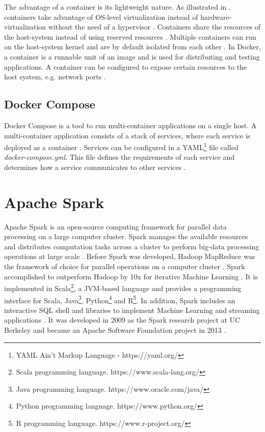 The advantage of a container is its lightweight nature. As illustrated in , containers take advantage of OS-level virtualization instead of hardware-virtualization without the need of a hypervisor \cite{Docker2020Docs, Nickoloff2019Docker}. Containers share the resources of the host-system instead of using reserved resources \cite{Bullington2020Docker}. Multiple containers can run on the host-system kernel and are by default isolated from each other \cite{Docker2020Docs}.
In Docker, a container is a runnable unit of an image and is used for distributing and testing applications. A container can be configured to expose certain resources to the host system, e.g. network ports \cite{Bullington2020Docker}.


\subsection{Docker Compose}
Docker Compose is a tool to run multi-container applications on a single host. A multi-container application consists of a stack of services, where each service is deployed as a container \cite{Bullington2020Docker, Docker2020Docs}.
Services can be configured in a YAML\footnote{YAML Ain't Markup Language - https://yaml.org/} file called \textit{docker-compose.yml}. This file defines the requirements of each service and determines how a service communicates to other services \cite{Kane2018DockerUp}.


\section{Apache Spark}
Apache Spark is an open-source computing framework for parallel data processing on a large computer cluster. Spark manages the available resources and distributes computation tasks across a cluster to perform big-data processing operations at large scale \cite{Chambers2018Spark}. Before Spark was developed, Hadoop MapReduce \cite{Dean2010MapReduce} was the framework of choice for parallel operations on a computer cluster \cite{Zaharia2010Spark}. Spark accomplished to outperform Hadoop by 10x for iterative Machine Learning \cite{Zaharia2010Spark}. It is implemented in Scala\footnote{Scala programming language. https://www.scala-lang.org/}, a JVM-based language and provides a programming interface for Scala, Java\footnote{Java programming language. https://www.oracle.com/java/}, Python\footnote{Python programming language. https://www.python.org/} and R\footnote{R programming language. https://www.r-project.org/}. In addition, Spark includes an interactive SQL shell and libraries to implement Machine Learning and streaming applications \cite{Chambers2018Spark}.
It was developed in 2009 as the Spark research project at UC Berkeley and became an Apache Software Foundation project in 2013 \cite{Chambers2018Spark}. 


